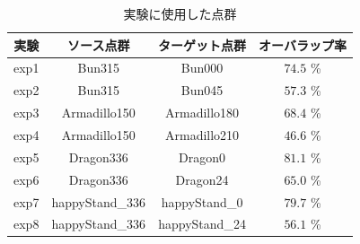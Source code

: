 \documentclass[twocolumn, 9pt, a4j, dvipdfmx]{jsarticle}
\begin{document}
\begin{table}[hbt]
    \begin{center}
    \small
    \caption{実験に使用した点群 \label{dynamic_reg_table}}
    \begin{tabular}{c ccc} \hline
        実験 & ソース点群 & ターゲット点群     & オーバラップ率 \\ \hline \hline
        exp1 &  Bun315  &  Bun000  & $ 74.5 $ \%    \\
        exp2 &  Bun315  &  Bun045  & $ 57.3 $ \%    \\ \hline
        exp3 &  Armadillo150  &  Armadillo180  & $ 68.4 $ \%    \\
        exp4 &  Armadillo150  &  Armadillo210  & $ 46.6 $ \%    \\ \hline
        exp5 &  Dragon336  &  Dragon0   & $ 81.1 $ \%    \\
        exp6 &  Dragon336  &  Dragon24  & $ 65.0 $ \%    \\ \hline
        exp7 &  happyStand\_336  &  happyStand\_0  & $ 79.7 $ \%    \\
        exp8 &  happyStand\_336  &  happyStand\_24 & $ 56.1 $ \%    \\ \hline


\end{tabular}
\end{center}
\end{table}
\end{document}
